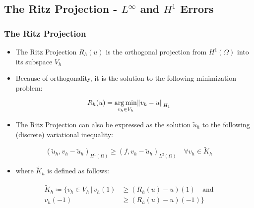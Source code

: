 \subsection{The Ritz Projection - $L^\infty$ and $H^1$ Errors} 
\begin{frame}
	\frametitle{The Ritz Projection}
	\begin{itemize}
		\item The Ritz Projection $R_h(u)$ is the orthogonal projection from $H^1(\Omega)$ into its subspace $V_h$
		\item Because of orthogonality, it is the solution to the following minimization problem:
	\end{itemize}
	\begin{equation}
		R_h(u) = \operatorname*{arg\,min}_{\substack{v_h \in V_h}} \norm{v_h - u}_{H_1}
	\end{equation}
\vspace{-0.5cm}
\begin{itemize}
	\item The Ritz Projection can also be expressed as the solution $\tilde{u}_h$ to the following (discrete) variational inequality:
\end{itemize}
\begin{equation}\label{eq:ritz_variational}
	(\tilde{u}_h, v_h-\tilde{u}_h)_{H^1(\Omega)} \geq (f, v_h-\tilde{u}_h)_{L^2(\Omega)} \quad \forall v_h \in \tilde{K}_h
\end{equation}
\vspace{-1cm}
\begin{itemize}
	\item where $\tilde{K}_h$ is defined as follows:
\end{itemize}
\vspace{-1cm}
\begin{align*}
	\tilde{K}_h \coloneqq \{v_h \in V_h \,|\,  v_h(1) &\geq (R_h(u) - u)(1) \quad \text{and} \\
	v_h(-1) &\geq (R_h(u) - u)(-1)\}
\end{align*}
\end{frame}

